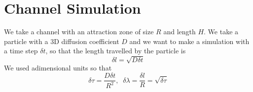 \documentclass[aps,onecolumn,11pt]{revtex4}
\begin{document}
\section{Channel Simulation}
We take a channel with an attraction zone of size $R$ and length $H$. We take a particle with a 3D diffusion coefficient $D$
and we want to make a simulation with a time step $\delta t$, so that the length travelled by the particle is
\begin{equation}
	\delta l = \sqrt{D\delta t}
\end{equation}
We used adimensional units so that 
\begin{equation}
	\delta \tau = \dfrac{D\delta t}{R^2},\;\;\delta \lambda = \dfrac{\delta l}{R} = \sqrt{\delta \tau}
\end{equation}
\end{document}
